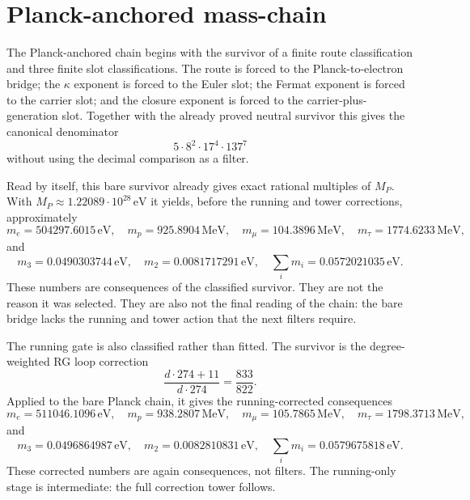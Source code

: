 \documentclass[11pt]{article}
\begin{document}
\begin{code}
\<%
\\
%
\>[2]\AgdaSymbol{;}\AgdaSpace{}%
%
\>[28]\AgdaSymbol{=}\AgdaSpace{}%
\<%
\\
%
\>[2]\AgdaSymbol{;}\AgdaSpace{}%
%
\>[28]\AgdaSymbol{=}\AgdaSpace{}%
\<%
\\
%
\>[2]\AgdaSymbol{;}\AgdaSpace{}%
\AgdaSpace{}%
\AgdaSymbol{=}\AgdaSpace{}%
\<%
\\
%
\>[2]\AgdaSymbol{;}\AgdaSpace{}%
\AgdaSpace{}%
\AgdaSymbol{=}\AgdaSpace{}%
\<%
\\
%
\>[2]\AgdaSymbol{\}}\<%
\end{code}

\section{Planck-anchored mass-chain}

The Planck-anchored chain begins with the survivor of a finite route
classification and three finite slot classifications.  The route is
forced to the Planck-to-electron bridge; the $\kappa$ exponent is forced
to the Euler slot; the Fermat exponent is forced to the carrier slot; and
the closure exponent is forced to the carrier-plus-generation slot.
Together with the already proved neutral survivor this gives the
canonical denominator
\[
  5\cdot 8^2\cdot 17^4\cdot 137^7
\]
without using the decimal comparison as a filter.

Read by itself, this bare survivor already gives exact rational
multiples of $M_P$.  With $M_P \approx
1.22089\cdot 10^{28}\,\mathrm{eV}$ it yields, before the running and
tower corrections, approximately
\[
  m_e = 504297.6015\,\mathrm{eV},\quad
  m_p = 925.8904\,\mathrm{MeV},\quad
  m_\mu = 104.3896\,\mathrm{MeV},\quad
  m_\tau = 1774.6233\,\mathrm{MeV},
\]
and
\[
  m_3 = 0.0490303744\,\mathrm{eV},\quad
  m_2 = 0.0081717291\,\mathrm{eV},\quad
  \sum_i m_i = 0.0572021035\,\mathrm{eV}.
\]
These numbers are consequences of the classified survivor.  They are not
the reason it was selected.  They are also not the final reading of the
chain: the bare bridge lacks the running and tower action that the next
filters require.

The running gate is also classified rather than fitted.  The survivor is
the degree-weighted RG loop correction
\[
  \frac{d\cdot 274 + 11}{d\cdot 274} = \frac{833}{822}.
\]
Applied to the bare Planck chain, it gives the running-corrected
consequences
\[
  m_e = 511046.1096\,\mathrm{eV},\quad
  m_p = 938.2807\,\mathrm{MeV},\quad
  m_\mu = 105.7865\,\mathrm{MeV},\quad
  m_\tau = 1798.3713\,\mathrm{MeV},
\]
and
\[
  m_3 = 0.0496864987\,\mathrm{eV},\quad
  m_2 = 0.0082810831\,\mathrm{eV},\quad
  \sum_i m_i = 0.0579675818\,\mathrm{eV}.
\]
These corrected numbers are again consequences, not filters.  The
running-only stage is intermediate: the full correction tower follows.
\end{document}
